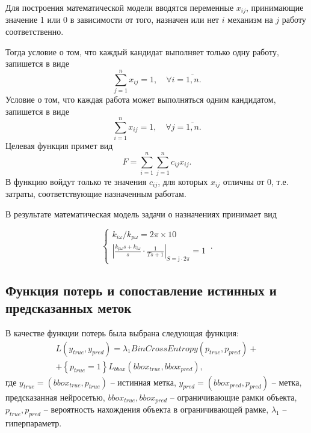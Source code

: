 \documentclass[14pt,a4paper]{extarticle}
\begin{document}
Для построения математической модели вводятся переменные $x_{ij}$, принимающие значение 1 или 0 в зависимости от того, назначен или нет $i$ механизм на $j$ работу соответственно.

Тогда условие о том, что каждый кандидат выполняет только одну работу, запишется в виде 
\begin{equation}
\sum_{j=1}^{n} x_{ij} = 1, \quad \forall i = \overline{1,n}.
\end{equation}
Условие о том, что каждая работа может выполняться одним кандидатом, запишется в виде
\begin{equation}
\sum_{i=1}^{n} x_{ij} = 1, \quad \forall j = \overline{1,n}.
\end{equation}
Целевая функция примет вид
\begin{equation}
F = \sum_{i=1}^{n}\sum_{j=1}^{n} c_{ij} x_{ij}.
\end{equation}
В функцию войдут только те значения $c_{ij}$, для которых $x_{ij}$ отличны от 0, т.е. затраты, соответствующие назначенным работам.

В результате математическая модель задачи о назначениях принимает вид

\begin{equation}
  \left\{\begin{array}{l}
    k_{i\omega}/k_{p\omega}=2\pi\times 10\\
    \left|
      \frac{k_{p\omega}s+k_{i\omega}}{s}\cdot\frac{1}{Ts+1}
    \right|_{S=\mathrm{j}\cdot2\pi}=1
  \end{array}\right.\,.
\end{equation}



\newpage
\subsection{Функция потерь и сопоставление истинных и предсказанных меток}

В качестве функции потерь была выбрана следующая функция:
\begin{multline}
L \left(y_{true}, y_{pred}\right) = \lambda_1 BinCrossEntropy\left(p_{true}, p_{pred}\right) +\\
+\left\{p_{true}=1\right\} L_{bbox} \left(bbox_{true}, bbox_{pred}\right),
\end{multline}
где $y_{true} = (bbox_{true}, p_{true})$ -- истинная метка, $y_{pred} = (bbox_{pred}, p_{pred})$ -- метка, предсказанная нейросетью, $bbox_{true}, bbox_{pred}$ -- ограничивающие рамки объекта, $p_{true}, p_{pred}$ -- вероятность нахождения объекта в ограничивающей рамке, $\lambda_1$ -- гиперпараметр. 
\end{document}
